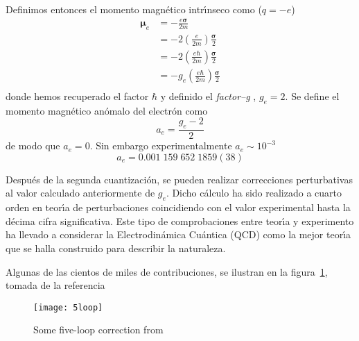 \begin{frame}
Definimos entonces el momento magn\'etico intr\'\i nseco como ($q=-e$)
\begin{align}
  \boldsymbol{\mu}_e&=-\frac{e\boldsymbol{\sigma}}{2m}\nonumber\\
  &=-2\left(\frac{e}{2m}\right)\frac{\boldsymbol{\sigma}}{2}\nonumber\\
  &=-2\left(\frac{e\hbar}{2m}\right)\frac{\boldsymbol{\sigma}}{2}\nonumber\\
  &=-g_e\left(\frac{e\hbar}{2m}\right)\frac{\boldsymbol{\sigma}}{2}\nonumber\\
\end{align}
donde hemos recuperado el factor $\hbar$ y definido el \emph{factor--g} \cite{spin},  $g_e=2$. Se define el momento magn\'etico an\'omalo del electr\'on como
\begin{equation}
  a_e=\frac{g_e-2}{2}
\end{equation}
de modo que $a_e=0$. Sin embargo experimentalmente $a_e\sim10^{-3}$
\begin{equation}
  a_e=0.001\;159\;652\;1859(38)
\end{equation}
\end{frame}
Despu\'es de la segunda cuantizaci\'on, se pueden realizar correcciones perturbativas al valor calculado anteriormente de $g_e$. Dicho c\'alculo ha sido realizado a cuarto orden en teor\'\i a de perturbaciones coincidiendo con el valor experimental hasta la d\'ecima cifra significativa. Este tipo de comprobaciones entre teor\'\i a y experimento ha llevado a considerar la Electrodin\'amica Cu\'antica (QCD) como la mejor teor\'\i a que se halla construido para describir la naturaleza.

\begin{frame}
Algunas de las cientos de miles de contribuciones, se ilustran en la figura~\ref{fig:5loop}, tomada de la referencia~\cite{Aoyama:2019ryr}
\begin{figure}
  \centering
  \texttt{[image: 5loop]}
  \caption{Some five-loop correction from~\cite{Aoyama:2019ryr}}
  \label{fig:5loop}
\end{figure}
\end{frame}

